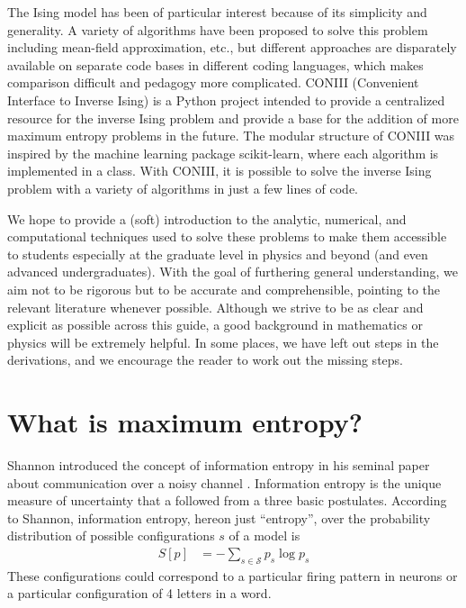 \documentclass[aps,prl,twocolumn]{revtex4-1}
\begin{document}
The Ising model has been of particular interest because of its simplicity and generality. A variety of algorithms have been proposed to solve this problem including mean-field approximation, etc., but different approaches are disparately available on separate code bases in different coding languages, which makes comparison difficult and pedagogy more complicated.
CONIII (Convenient Interface to Inverse Ising) is a Python project intended to provide a centralized resource for the inverse Ising problem and provide a base for the addition of more maximum entropy problems in the future. 
The modular structure of CONIII was inspired by the machine learning package scikit-learn, where each algorithm is implemented in a class.
With CONIII, it is possible to solve the inverse Ising problem with a variety of algorithms in just a few lines of code.

We hope to provide a (soft) introduction to the analytic, numerical, and computational techniques used to solve these problems to make them accessible to students especially at the graduate level in physics and beyond (and even advanced undergraduates). With the goal of furthering general understanding, we aim not to be rigorous but to be accurate and comprehensible, pointing to the relevant literature whenever possible. Although we strive to be as clear and explicit as possible across this guide, a good background in mathematics or physics will be extremely helpful. In some places, we have left out steps in the derivations, and we encourage the reader to work out the missing steps.

\section{What is maximum entropy?}
Shannon introduced the concept of information entropy in his seminal paper about communication over a noisy channel \cite{Shannon:1948wk}. Information entropy is the unique measure of uncertainty that a followed from a three basic postulates. According to Shannon, information entropy, hereon just ``entropy'', over the probability distribution of possible configurations $s$ of a model is
\begin{align}
	S[p] &= -\sum_{s\in \mathcal{S}} p_s \log p_s
\end{align}
These configurations could correspond to a particular firing pattern in neurons or a particular configuration of 4 letters in a word.
\end{document}
